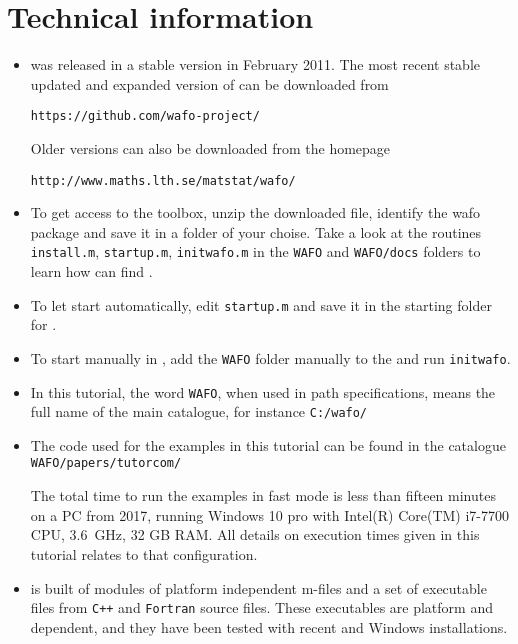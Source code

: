 \chapter*{Technical information}
\vspace{-5mm}
\begin{itemize}
\setlength\itemsep{0mm}

\item
\wf{} was released in a stable version in February 2011. 
The most recent stable updated and expanded version of \wf{} can be downloaded from

\verb+https://github.com/wafo-project/+

Older versions can also be downloaded from the \wf{} homepage \cite{WAFO-group2000Wafo}


\noindent
\verb+http://www.maths.lth.se/matstat/wafo/+

\item To get access to the \wf{} toolbox, unzip the downloaded file, identify the {\sf wafo} package and save it in a
folder of your choise. Take a look at the routines \verb+install.m+, \verb+startup.m+, 
 \verb+initwafo.m+ in the \verb+WAFO+ and \verb+WAFO/docs+ folders to learn how \ML{} can find \wf{}. 

\item To let \ML{} start \wf{} automatically, edit \verb+startup.m+ and save it 
in the starting folder for \ML{}.   
\item To start \wf{} manually in \ML{}, add the \verb+WAFO+ 
folder manually to the 
and run \verb+initwafo+. 
\item In this tutorial, the word \verb+WAFO+, when used in path
  specifications, means the full name of the
  \wf{} main catalogue, for instance 
  \verb+C:/wafo/+
  
\item The \ML{} code used for the examples in this tutorial can be found in the
  \wf{} catalogue 
\verb+WAFO/papers/tutorcom/+

The total time to run the examples in fast mode is less than fifteen minutes on a PC from 2017, running 
Windows 10 pro with Intel(R) Core(TM) i7-7700 CPU, 3.6~GHz, 32 GB RAM. All details on execution times 
given in this tutorial relates to that configuration.

\item
\wf{} is built of modules of platform independent \ML{} m-files
and a set of executable files from \verb!C++! and \verb+Fortran+
source files. These executables are platform and  dependent,
and they have been tested with recent \ML{} and {\sc Windows} installations.


\end{itemize}
